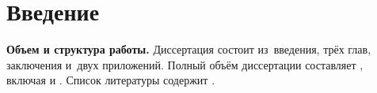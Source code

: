 \chapter*{Введение}                         %

\renewcommand{\actuality}{}
\renewcommand{\progress}{}
\renewcommand{\aim}{{\textbf\aimTXT}}
\renewcommand{\tasks}{\textbf{\tasksTXT}}
\renewcommand{\novelty}{\textbf{\noveltyTXT}}
\renewcommand{\influence}{\textbf{\influenceTXT}}
\renewcommand{\methods}{\textbf{\methodsTXT}}
\renewcommand{\defpositions}{\textbf{\defpositionsTXT}}
\renewcommand{\reliability}{\textbf{\reliabilityTXT}}
\renewcommand{\probation}{\textbf{\probationTXT}}
\renewcommand{\contribution}{\textbf{\contributionTXT}}
\renewcommand{\publications}{\textbf{\publicationsTXT}}


\textbf{Объем и структура работы.} Диссертация состоит из~введения, трёх глав,
заключения и~двух приложений.
%
Полный объём диссертации составляет
, включая
 и
.   Список литературы содержит
.
